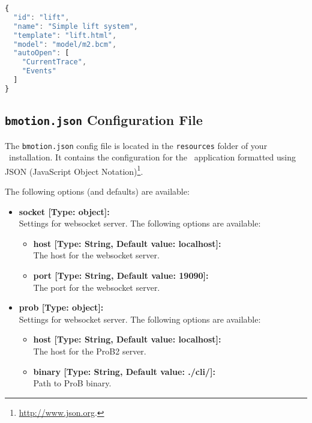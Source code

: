\begin{minipage}{\linewidth}
\begin{lstlisting}[language=JavaScript, caption={Example manifest file for the simple lift system (JSON)}, label={lst:lift_manifest}]
{
  "id": "lift",
  "name": "Simple lift system",
  "template": "lift.html",
  "model": "model/m2.bcm",
  "autoOpen": [
    "CurrentTrace",
    "Events"
  ]
}
\end{lstlisting}
\end{minipage}

\subsection{\texttt{bmotion.json} Configuration File}
\label{sec:configfile}

The \texttt{bmotion.json} config file is located in the \texttt{resources} folder of your \bms\ installation.
It contains the configuration for the \bms\ application formatted using JSON (JavaScript Object Notation)\footnote{\url{http://www.json.org}.}.


The following options (and defaults) are available:

\begin{itemize}

	\item[] \textbf{socket [Type: object]:}\\ Settings for websocket server. The following options are available:
	\begin{itemize}
		\item[] \textbf{host [Type: String, Default value: localhost]:}\\ The host for the websocket server.
		\item[] \textbf{port [Type: String, Default value: 19090]:}\\ The port for the websocket server.
	\end{itemize}

	\item[] \textbf{prob [Type: object]:}\\ Settings for websocket server. The following options are available:
	\begin{itemize}
		\item[] \textbf{host [Type: String, Default value: localhost]:}\\ The host for the ProB2 server.
		\item[] \textbf{binary [Type: String, Default value: ./cli/]:}\\ Path to ProB binary.
	\end{itemize}

\end{itemize}
